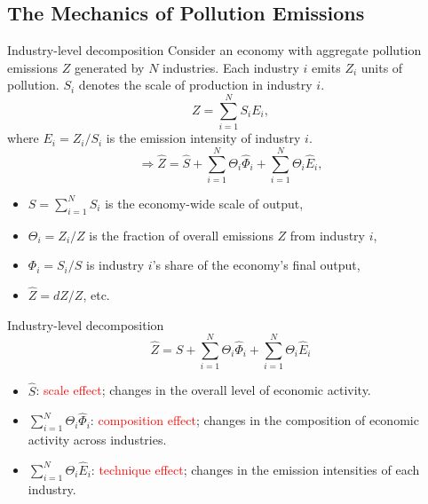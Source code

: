 \documentclass{beamer}
\begin{document}
\subsection{The Mechanics of Pollution Emissions}
\begin{frame}[shrink]
	\transfade %
	\tableofcontents[sectionstyle=show/shaded,subsectionstyle=show/shaded/hide]
	\addtocounter{framenumber}{-1}
\end{frame}
\begin{frame}{Industry-level decomposition}
	Consider an economy with aggregate pollution emissions $Z$ generated by $N$ industries. Each industry $i$ emits $Z_i$ units of pollution. $S_i$ denotes the scale of production in industry $i$.
	\begin{equation}
		Z=\sum_{i=1}^NS_iE_i,
	\end{equation}
	where $E_i=Z_i/S_i$ is the emission intensity of industry $i$.
	\begin{equation}
		\Rightarrow \hat{Z}=\hat{S}+\sum_{i=1}^N\Theta_i\hat{\Phi}_i+\sum_{i=1}^N\Theta_i\hat{E}_i,
	\end{equation}
	\begin{itemize}
		\item $S=\sum_{i=1}^NS_i$ is the economy-wide scale of output,
		\item $\Theta_i=Z_i/Z$ is the fraction of overall emissions $Z$ from industry $i$,
		\item $\Phi_i=S_i/S$ is industry $i$'s share of the economy's final output,
		\item $\hat{Z}=dZ/Z$, etc.
	\end{itemize}
\end{frame}
\begin{frame}{Industry-level decomposition}
	\begin{equation}\nonumber
		\hat{Z}=\hat{S}+\sum_{i=1}^N\Theta_i\hat{\Phi}_i+\sum_{i=1}^N\Theta_i\hat{E}_i
	\end{equation}
	\begin{itemize}
		\item $\hat{S}$: \textcolor{red}{scale effect}; changes in the overall level of economic activity.
		\item $\sum_{i=1}^N\Theta_i\hat{\Phi}_i$: \textcolor{red}{composition effect}; changes in the composition of economic activity across industries.
		\item $\sum_{i=1}^N\Theta_i\hat{E}_i$: \textcolor{red}{technique effect}; changes in the emission intensities of each industry.
	\end{itemize}
\end{frame}
\end{document}
